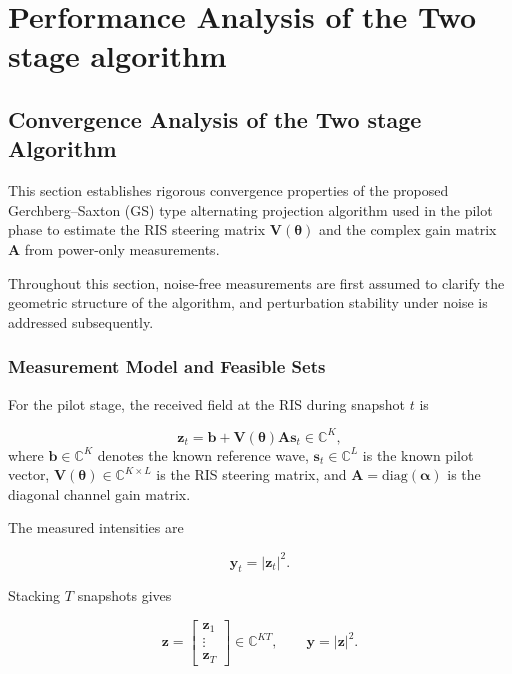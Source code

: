 \documentclass[journal]{IEEEtran}
\begin{document}
\section{Performance Analysis of the Two stage algorithm}


\subsection{Convergence Analysis of the Two stage Algorithm}

This section establishes rigorous convergence properties of the proposed Gerchberg--Saxton (GS) type alternating projection algorithm used in the pilot phase to estimate the RIS steering matrix $\mathbf V(\boldsymbol\theta)$ and the complex gain matrix $\mathbf A$ from power-only measurements.

Throughout this section, noise-free measurements are first assumed to clarify the geometric structure of the algorithm, and perturbation stability under noise is addressed subsequently.

\subsubsection{Measurement Model and Feasible Sets}

For the pilot stage, the received field at the RIS during snapshot $t$ is

\begin{equation}
\mathbf z_t
=
\mathbf b
+
\mathbf V(\boldsymbol\theta)\mathbf A\mathbf s_t
\in \mathbb C^{K},
\end{equation}
where $\mathbf b\in\mathbb C^{K}$ denotes the known reference wave,
$\mathbf s_t\in\mathbb C^{L}$ is the known pilot vector,
$\mathbf V(\boldsymbol\theta)\in\mathbb C^{K\times L}$ is the RIS steering matrix,
and $\mathbf A=\mathrm{diag}(\boldsymbol\alpha)$ is the diagonal channel gain
matrix.

The measured intensities are

\begin{equation}
\mathbf y_t = |\mathbf z_t|^2 .
\end{equation}

Stacking $T$ snapshots gives

\begin{equation}
\mathbf z =
\begin{bmatrix}
\mathbf z_1\\
\vdots\\
\mathbf z_T
\end{bmatrix}
\in \mathbb C^{KT},
\qquad
\mathbf y = |\mathbf z|^2 .
\end{equation}
\end{document}
